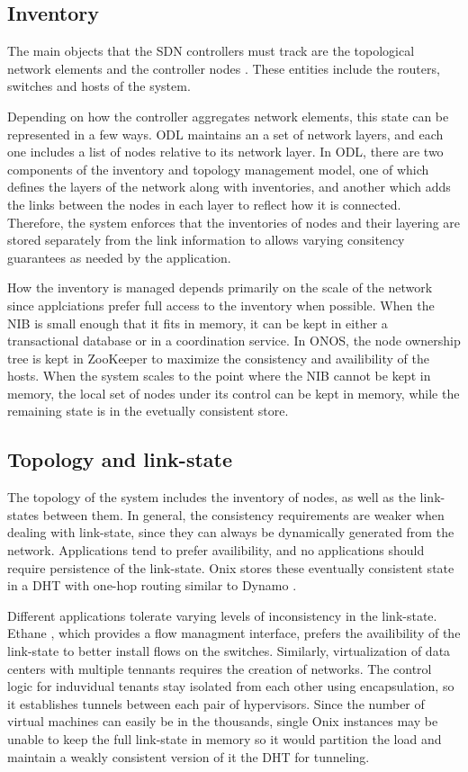 \documentclass[letterpaper,twocolumn,10pt]{article}
\begin{document}
\subsection*{Inventory}

The main objects that the SDN controllers must track are the topological network elements and the controller nodes \cite{network2015topologies}. These entities include the routers, switches and hosts of the system.

Depending on how the controller aggregates network elements, this state can be represented in a few ways. ODL maintains an a set of network layers, and each one includes a list of nodes relative to its network layer. In ODL, there are two components of the inventory and topology management model, one of which defines the layers of the network along with inventories, and another which adds the links between the nodes in each layer to reflect how it is connected.
Therefore, the system enforces that the inventories of nodes and their layering are stored separately from the link information to allows varying consitency guarantees as needed by the application.

How the inventory is managed depends primarily on the scale of the network since applciations prefer full access to the inventory when possible. When the NIB is small enough that it fits in memory, it can be kept in either a transactional database or in a coordination service. In ONOS, the node ownership tree is kept in ZooKeeper to maximize the consistency and availibility of the hosts. When the system scales to the point where the NIB cannot be kept in memory, the local set of nodes under its control can be kept in memory, while the remaining state is in the evetually consistent store.

\subsection*{Topology and link-state}

The topology of the system includes the inventory of nodes, as well as the link-states between them. In general, the consistency requirements are weaker when dealing with link-state, since they can always be dynamically generated from the network. Applications tend to prefer availibility, and no applications should require persistence of the link-state. Onix stores these eventually consistent state in a DHT with one-hop routing similar to Dynamo \cite{decandia2007dynamo}.

Different applications tolerate varying levels of inconsistency in the link-state. Ethane \cite{koponen2010onix}, which provides a flow managment interface, prefers the availibility of the link-state to better install flows on the switches. Similarly, virtualization of data centers with multiple tennants requires the creation of networks. The control logic for induvidual tenants stay isolated from each other using encapsulation, so it establishes tunnels between each pair of hypervisors. Since the number of virtual machines can easily be in the thousands, single Onix instances may be unable to keep the full link-state in memory so it would partition the load and maintain a weakly consistent version of it the DHT for tunneling.
\end{document}
